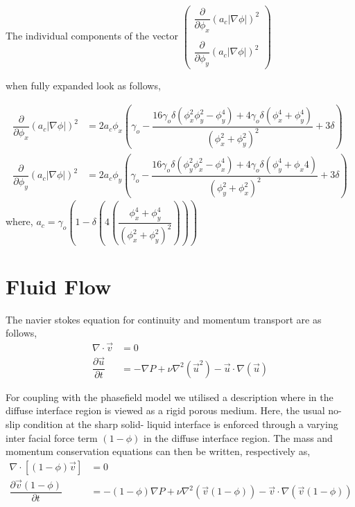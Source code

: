 \documentclass[a4paper]{report}
\begin{document}
\begin{mdframed}[style=MyFrame]
The individual components of the vector 
$\begin{pmatrix}
	\dfrac{\partial}{\partial \phi_x}\left(a_c|\nabla\phi|\right)^2\\
	\\
	\dfrac{\partial}{\partial \phi_y}\left(a_c|\nabla\phi|\right)^2
\end{pmatrix}$

when fully expanded look as follows,

\begin{align}
 \dfrac{\partial}{\partial \phi_x}\left(a_c|\nabla\phi|\right)^2 &= 2a_c\phi_x\left(\gamma_o - \dfrac{16\gamma_o\delta\left(\phi_x^2\phi_y^2 - \phi_y^4\right)+4\gamma_o\delta\left(\phi_x^4+\phi_y^4\right)}
 {\left(\phi_x^2+\phi_y^2\right)^2} + 3\delta\right)\\ 
 \dfrac{\partial}{\partial \phi_y}\left(a_c|\nabla\phi|\right)^2 &= 2a_c\phi_y\left(\gamma_o - \dfrac{16\gamma_o\delta\left(\phi_y^2\phi_x^2 - \phi_x^4\right)+4\gamma_o\delta\left(\phi_y^4+\phi_x4\right)}
 {\left(\phi_y^2+\phi_x^2\right)^2} + 3\delta\right)
\end{align}
where, $ a_c = \gamma_o\left(1 - \delta\left(4\left(\dfrac{\phi_x^4+\phi_y^4}{\left(\phi_x^2+\phi_y^2\right)^2}\right)\right)\right)$
\end{mdframed}

\section{Fluid Flow}
The navier stokes equation for continuity and momentum transport are as follows,
\begin{align}
	\nabla\cdot\vec{v} &= 0\\
	\dfrac{\partial \vec{u}}{\partial t} &= - \nabla P + \nu\nabla^2\left(\vec{u}^2\right) - \vec{u}\cdot\nabla\left(\vec{u}\right)
\end{align}

For coupling with the phasefield model we utilised a description where in the diffuse interface 
region is viewed as a rigid porous medium. Here, the usual no-slip condition at the sharp solid- 
liquid interface is enforced through a varying inter facial force term $(1-\phi)$ in the diffuse interface 
region.
The mass and momentum conservation equations can then be written, respectively as,
\begin{align}
	\nabla\cdot[(1-\phi)\vec{v}] &= 0\\
	\dfrac{\partial \vec{v}(1-\phi)}{\partial t} &= -(1-\phi)\nabla P + \nu\nabla^2\left(\vec{v}(1-\phi)\right) - \vec{v}\cdot\nabla\left(\vec{v}(1-\phi)\right)
\end{align}
\end{document}
